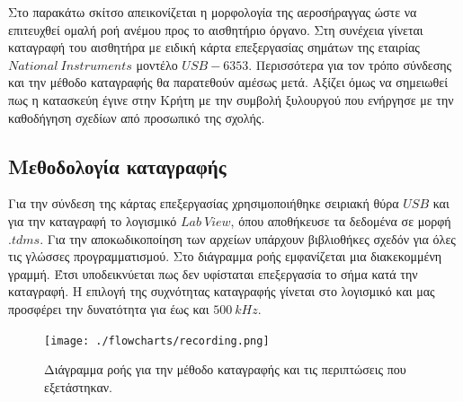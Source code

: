 \documentclass[breaklines=true, 12pt]{article}
\begin{document}
{{{Στο παρακάτω σκίτσο απεικονίζεται η μορφολογία της αεροσήραγγας ώστε να
επιτευχθεί ομαλή ροή ανέμου προς το αισθητήριο όργανο. Στη συνέχεια γίνεται
καταγραφή του αισθητήρα με ειδική κάρτα επεξεργασίας σημάτων της εταιρίας
\(National\ Instruments\) μοντέλο \(USB-6353\). Περισσότερα για τον τρόπο σύνδεσης και
την μέθοδο καταγραφής θα παρατεθούν αμέσως μετά. Αξίζει όμως να σημειωθεί
πως η κατασκεύη έγινε στην Κρήτη με την συμβολή ξυλουργού που ενήργησε με την
καθοδήγηση σχεδίων από προσωπικό της σχολής.
\subsection{Μεθοδολογία καταγραφής}
\label{sec:orgf7a53b7}
Για την σύνδεση της κάρτας επεξεργασίας χρησιμοποιήθηκε σειριακή θύρα \(USB\) και
για την καταγραφή το λογισμικό \(Lab\ View\), όπου αποθήκευσε τα δεδομένα σε μορφή
\(.tdms\). Για την αποκωδικοποίηση των αρχείων υπάρχουν βιβλιοθήκες σχεδόν για όλες
τις γλώσσες προγραμματισμού. Στο διάγραμμα ροής εμφανίζεται μια διακεκομμένη
γραμμή. Έτσι υποδεικνύεται πως δεν υφίσταται επεξεργασία το σήμα κατά την
καταγραφή. Η επιλογή της συχνότητας καταγραφής γίνεται στο λογισμικό και μας
προσφέρει την δυνατότητα για έως και \(500\ kHz\).
\begin{figure}[htbp]
\centering
\texttt{[image: ./flowcharts/recording.png]}
\caption{Διάγραμμα ροής για την μέθοδο καταγραφής και τις περιπτώσεις που εξετάστηκαν.}
\end{figure}
}}}
\end{document}
